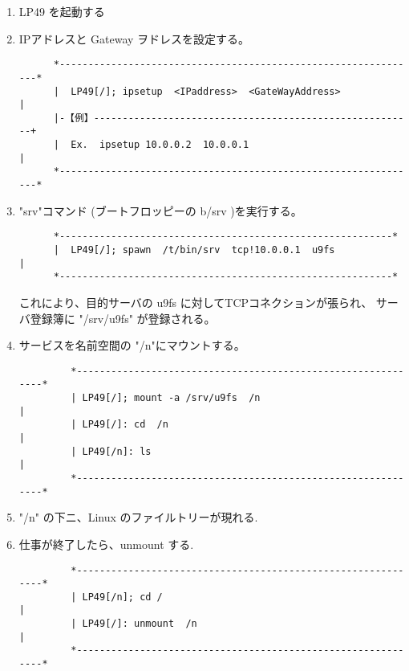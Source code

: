 \begin{enumerate}
\item  LP49 を起動する\\

\item IPアドレスと Gateway ヲドレスを設定する。\\

\begin{verbatim}    
      *---------------------------------------------------------------*  
      |  LP49[/]; ipsetup  <IPaddress>  <GateWayAddress>              | 
      |-【例】--------------------------------------------------------+  
      |  Ex.  ipsetup 10.0.0.2  10.0.0.1                              | 
      *---------------------------------------------------------------* 
\end{verbatim}    

\item "srv"コマンド (ブートフロッピーの b/srv )を実行する。\\

\begin{verbatim}    
      *----------------------------------------------------------*
      |  LP49[/]; spawn  /t/bin/srv  tcp!10.0.0.1  u9fs            |
      *----------------------------------------------------------*
\end{verbatim}    

       これにより、目的サーバの u9fs に対してTCPコネクションが張られ、
       サーバ登録簿に "/srv/u9fs" が登録される。


\item  サービスを名前空間の "/n"にマウントする。\\

\begin{verbatim}    
         *-------------------------------------------------------------* 
         | LP49[/]; mount -a /srv/u9fs  /n                             |  
         | LP49[/]: cd  /n                                             |  
         | LP49[/n]: ls                                                |  
         *-------------------------------------------------------------* 
\end{verbatim}    

\item "/n" の下ニ、Linux のファイルトリーが現れる.\\

\item  仕事が終了したら、unmount する.\\

\begin{verbatim}
         *-------------------------------------------------------------* 
         | LP49[/n]; cd /                                              |  
         | LP49[/]: unmount  /n                                        |  
         *-------------------------------------------------------------*  
\end{verbatim}    
\end{enumerate}


